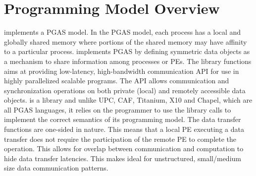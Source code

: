 \section{Programming Model Overview}
\openshmem implements a \ac{PGAS} model. In the \ac{PGAS} model, each process has a local and 
globally shared memory where portions of the shared memory may have affinity to a particular process. 
\openshmem implements \ac{PGAS} by defining symmetric data objects as a mechanism to share information among \openshmem processes or \acp{PE}. 
The \openshmem library functions aims at providing low-latency, high-bandwidth communication \ac{API} for use in highly parallelized 
scalable programs. The \ac{API} allows communication and synchronization operations on both private (local) and remotely accessible data objects. 
\openshmem is a library and unlike UPC, CAF, Titanium, X10 and Chapel, which are all
PGAS languages, it relies on the programmer to use the library calls  to implement the correct semantics of its programming model.
The \openshmem data transfer functions are one-sided in nature. This means that a local \ac{PE} executing a data transfer does not require the participation of the remote \ac{PE} to complete the operation. This allows for overlap between communication and computation to hide data transfer latencies. This makes  \openshmem ideal for unstructured, small/medium size data communication patterns.


